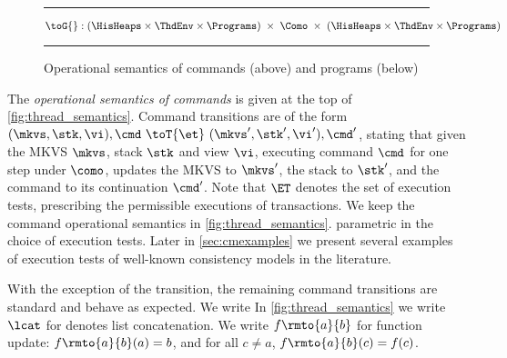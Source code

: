 \begin{figure}[!t]
\[\]
\vspace{5pt}
\hrule%
\[
	\toG{} : 
    ( \HisHeaps \times \ThdEnv \times \Programs) 
    \;\times\; \Como \;\times\;
    ( \HisHeaps \times \ThdEnv \times \Programs) 
\]
\begin{mathpar}
\end{mathpar}
%
\hrule
\caption{Operational semantics of commands (above) and programs (below)}
\label{def:thread_semantics}
\label{fig:thread_semantics}
\label{def:thread_pool_semantics}
\label{fig:thread_pool_semantics}
\label{def:program_semantics}
\label{fig:program_semantics}
\end{figure}


The \emph{operational semantics of commands} is given at the top of \cref{fig:thread_semantics}. 
Command transitions are of the form $(\mkvs, \stk, \vi), \cmd \ \toT{\et} \ (\mkvs', \stk', \vi') , \cmd'$, stating that given the MKVS $\mkvs$, stack $\stk$ and view $\vi$, executing command $\cmd$ for one step under $\como$, updates the MKVS to $\mkvs'$, the stack to $\stk'$, and the command to its continuation $\cmd'$. 
Note that $\ET$ denotes the set of execution tests, prescribing the permissible executions of transactions. 
We keep the command operational semantics in \cref{fig:thread_semantics}.  parametric in the choice of execution tests. 
Later in \cref{sec:cmexamples} we present several examples of execution tests of well-known consistency models in the literature. 

With the exception of the  transition, the remaining command transitions are standard and behave as expected. We write 
In \cref{fig:thread_semantics} we write $\lcat$ for denotes list concatenation.
We write $f \rmto{a}{b}$ for function update: $f \rmto{a}{b}(a) = b$, and for all $c \ne a$, $f \rmto{a}{b}(c) = f(c)$.

